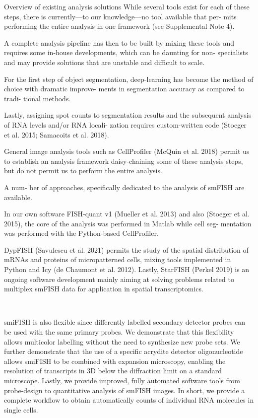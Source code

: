 
Overview of existing analysis solutions
While several tools exist for each of these steps, there is currently—to our
knowledge—no tool available that per- mits performing the entire analysis in one
framework (see Supplemental Note 4).

A complete analysis pipeline has then to
be built by mixing these tools and requires some in-house developments, which
can be daunting for non- specialists and may provide solutions that are unstable
and difficult to scale.

For the first step of object segmentation, deep-learning has become the method of
choice with dramatic improve- ments in segmentation accuracy as compared to tradi- tional methods.

Lastly, assigning spot counts to segmentation results and the subsequent analysis of
RNA levels and/or RNA locali- zation requires custom-written code (Stoeger et al. 2015; Samacoits et al. 2018).

General image analysis tools such as CellProfiler (McQuin et al. 2018) permit us
to establish an analysis framework daisy-chaining some of these analysis steps,
but do not permit us to perform the entire analysis.

A num- ber of approaches,
specifically dedicated to the analysis of smFISH are available.

In our own software
FISH-quant v1 (Mueller et al. 2013) and also (Stoeger et al. 2015), the core of
the analysis was performed in Matlab while cell seg- mentation was performed with
the Python-based CellProfiler.

DypFISH (Savulescu et al. 2021) permits the study
of the spatial distribution of mRNAs and proteins of micropatterned cells, mixing
tools implemented in Python and Icy (de Chaumont et al. 2012). Lastly, StarFISH
(Perkel 2019) is an ongoing software
development mainly aiming at solving problems related to multiplex smFISH data
for application in spatial transcriptomics.


~\cite{mueller_fish-quant_2013} %
~\cite{tsanov_smifish_2016}

smiFISH is also flexible since differently labelled secondary detector probes
can be used with the same primary probes. We demonstrate that this flexibility
allows multicolor labelling without the need to synthesize new probe sets. We
further demonstrate that the use of a specific acrydite detector oligonucleotide
allows smiFISH to be combined with expansion microscopy, enabling the resolution
of transcripts in 3D below the diffraction limit on a standard microscope.
Lastly, we provide improved, fully automated software tools from probe-design
to quantitative analysis of smFISH images. In short, we provide a complete
workflow to obtain automatically counts of individual RNA molecules in single cells.

